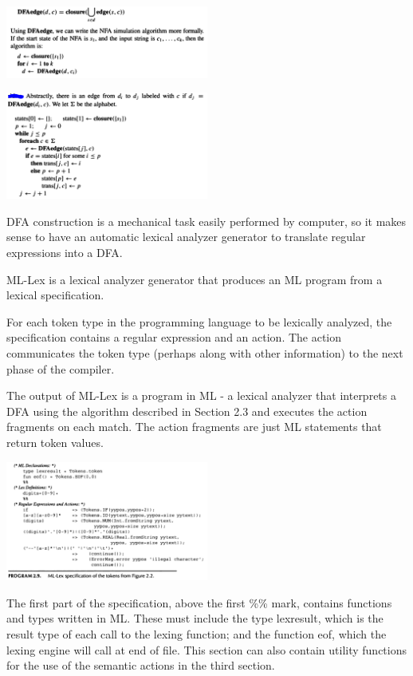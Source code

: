 \documentclass[8pt, a4paper, oneside, twocolumn]{extarticle}
\begin{document}
\includegraphics[width=0.5\textwidth,height=0.5\textheight,keepaspectratio]{nfa1}

\includegraphics[width=0.5\textwidth,height=0.5\textheight,keepaspectratio]{nfa2}

DFA construction is a mechanical task easily performed by computer, so it 
makes sense to have an automatic lexical analyzer generator to translate  
regular expressions into a DFA. 

ML-Lex is a lexical analyzer generator that produces an ML program from 
a lexical specification. 

For each token type in the programming language to 
be lexically analyzed, the specification contains a regular expression and an 
action. The action communicates the token type (perhaps along with other 
information) to the next phase of the compiler. 

The output of ML-Lex is a program in ML - a lexical analyzer that  
interprets a DFA using the algorithm described in Section 2.3 and executes the 
action fragments on each match. The action fragments are just ML statements 
that return token values. 

\includegraphics[width=0.5\textwidth,height=0.5\textheight,keepaspectratio]{lex}

The first part of the specification, above the first \%\% mark, contains  
functions and types written in ML. These must include the type lexresult, 
which is the result type of each call to the lexing function; and the  
function eof, which the lexing engine will call at end of file. This section can 
also contain utility functions for the use of the semantic actions in the third 
section. 
\end{document}
